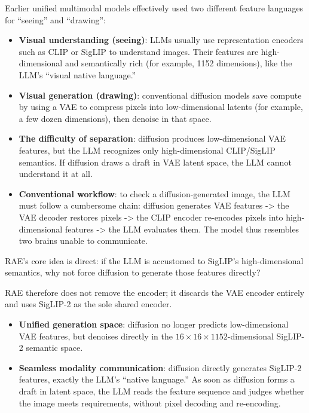 Earlier unified multimodal models effectively used two different feature languages for ``seeing'' and ``drawing'':

\begin{itemize}
\item
  \textbf{Visual understanding (seeing)}: LLMs usually use representation encoders such as CLIP or SigLIP to understand images. Their features are high-dimensional and semantically rich (for example, 1152 dimensions), like the LLM's ``visual native language.''
\item
  \textbf{Visual generation (drawing)}: conventional diffusion models save compute by using a VAE to compress pixels into low-dimensional latents (for example, a few dozen dimensions), then denoise in that space.
\item
  \textbf{The difficulty of separation}: diffusion produces low-dimensional VAE features, but the LLM recognizes only high-dimensional CLIP/SigLIP semantics. If diffusion draws a draft in VAE latent space, the LLM cannot understand it at all.
\item
  \textbf{Conventional workflow}: to check a diffusion-generated image, the LLM must follow a cumbersome chain: diffusion generates VAE features -\textgreater{} the VAE decoder restores pixels -\textgreater{} the CLIP encoder re-encodes pixels into high-dimensional features -\textgreater{} the LLM evaluates them. The model thus resembles two brains unable to communicate.
\end{itemize}

RAE's core idea is direct: if the LLM is accustomed to SigLIP's high-dimensional semantics, why not force diffusion to generate those features directly?

RAE therefore does not remove the encoder; it discards the VAE encoder entirely and uses SigLIP-2 as the sole shared encoder.

\begin{itemize}
\tightlist
\item
  \textbf{Unified generation space}: diffusion no longer predicts low-dimensional VAE features, but denoises directly in the \(16\times16\times1152\)-dimensional SigLIP-2 semantic space.
\item
  \textbf{Seamless modality communication}: diffusion directly generates SigLIP-2 features, exactly the LLM's ``native language.'' As soon as diffusion forms a draft in latent space, the LLM reads the feature sequence and judges whether the image meets requirements, without pixel decoding and re-encoding.
\end{itemize}

